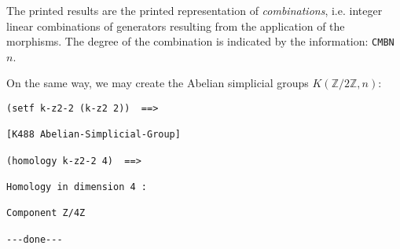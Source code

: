 The printed results are the printed representation of {\em combinations}, i.e.
integer linear combinations of generators resulting from the application of the
morphisms. The degree of the combination is indicated by the information: {\tt CMBN $n$}.
\par
On the same way, we may create the Abelian simplicial groups $K(\mathbb{Z}/2\mathbb{Z}, n)$:
{\footnotesize\begin{verbatim}
(setf k-z2-2 (k-z2 2))  ==>

[K488 Abelian-Simplicial-Group]

(homology k-z2-2 4)  ==>

Homology in dimension 4 :

Component Z/4Z

---done---
\end{verbatim}}

